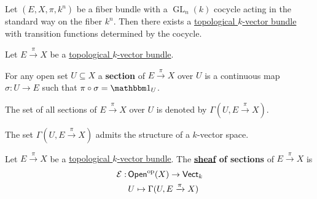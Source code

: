 \documentclass[../../../main]{subfiles}
\begin{document}
\begin{lemma}
  Let \((E, X, \pi, k^{n})\) be a fiber bundle with a \(\operatorname{GL}_{n}(k)\) cocycle acting in the standard way on the fiber \(k^{n}\).
  Then there exists a \hyperref[def:topological-vector-bundle]{topological \(k\)-vector bundle} with transition functions determined by the cocycle.
\end{lemma}


\begin{example}
\end{example}

\begin{definition}\label{def:section-topological-vector-bundle}
  Let \(E \xrightarrow{\pi} X\) be a \hyperref[def:topological-vector-bundle]{topological \(k\)-vector bundle}.

  For any open set \(U \subseteq X\) a \textbf{section} of \(E \xrightarrow{\pi} X\) over \(U\) is a continuous map \(\sigma: U \to E\) such that \(\pi \circ \sigma = \id_{U}\).

  The set of all sections of \(E \xrightarrow{\pi} X\) over \(U\) is denoted by \(\Gamma(U, E \xrightarrow{\pi} X)\).
\end{definition}
\begin{remark}
  The set \(\Gamma(U, E \xrightarrow{\pi} X)\) admits the structure of a \(k\)-vector space.
\end{remark}

\begin{definition}\label{def:sheaf-of-sections-topological-vector-bundle}
  Let \(E \xrightarrow{\pi} X\) be a \hyperref[def:topological-vector-bundle]{topological \(k\)-vector bundle}.
  The \textbf{\hyperref[def:sheaf]{sheaf} of sections} of \(E \xrightarrow{\pi} X\) is
  \begin{align*}
    \mathcal{E}:\,& \mathsf{Open}^{\operatorname*{op}}(X) \to \mathsf{Vect}_{k} \\
        &U \mapsto \Gamma(U, E \xrightarrow{\pi} X)
  \end{align*}
\end{definition}
\end{document}
